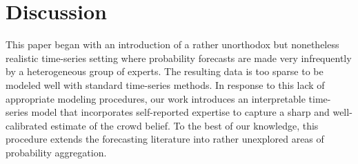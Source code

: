 \documentclass[aoas, preprint]{imsart}
\numberwithin{equation}{section}
\theoremstyle{plain}
\begin{document}
\section{Discussion}
This paper began with an introduction of a rather unorthodox but nonetheless realistic time-series setting where probability forecasts are made very infrequently by a heterogeneous group of experts. The resulting data is too sparse to be modeled well with standard time-series methods.  In response to this lack of appropriate modeling procedures, our work introduces an interpretable time-series model that incorporates self-reported expertise to capture a sharp and well-calibrated estimate of the crowd belief. 
To the best of our knowledge, this procedure extends the forecasting literature into rather unexplored areas of probability aggregation.
%
\end{document}
